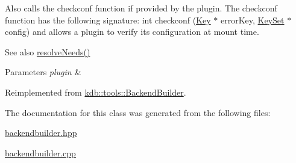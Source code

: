 Also calls the checkconf function if provided by the plugin. The checkconf function has the following signature\+: int checkconf (\mbox{\hyperlink{classkdb_1_1Key}{Key}} $\ast$ error\+Key, \mbox{\hyperlink{classkdb_1_1KeySet}{Key\+Set}} $\ast$ config) and allows a plugin to verify its configuration at mount time.

\begin{DoxySeeAlso}{See also}
\mbox{\hyperlink{classkdb_1_1tools_1_1BackendBuilder_a6e6c23716dc72ef68f8acfd71fc802a9}{resolve\+Needs()}} 
\end{DoxySeeAlso}

\begin{DoxyParams}{Parameters}
{\em plugin} & \\
\hline
\end{DoxyParams}


Reimplemented from \mbox{\hyperlink{classkdb_1_1tools_1_1BackendBuilder_a987d2c3711399e24b42c38e652c0e1c4}{kdb\+::tools\+::\+Backend\+Builder}}.



The documentation for this class was generated from the following files\+:\begin{DoxyCompactItemize}
\item 
\mbox{\hyperlink{backendbuilder_8hpp}{backendbuilder.\+hpp}}\item 
\mbox{\hyperlink{backendbuilder_8cpp}{backendbuilder.\+cpp}}\end{DoxyCompactItemize}
